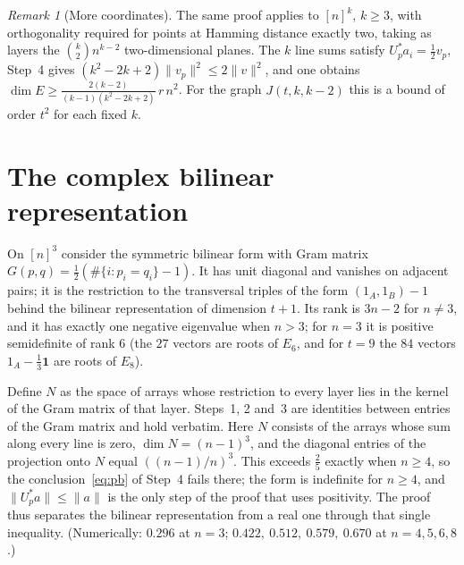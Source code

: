 \documentclass[11pt]{article}
\theoremstyle{remark}
\newtheorem{remark}[theorem]{Remark}
\newcommand{\norm}[1]{\lVert #1\rVert}
\begin{document}
\begin{remark}[More coordinates]\label{rem:k}
The same proof applies to $[n]^k$, $k\ge3$, with orthogonality required for points at Hamming distance exactly
two, taking as layers the $\binom k2n^{k-2}$ two-dimensional planes. The $k$ line sums satisfy
$U_p^*a_i=\tfrac12v_p$, Step~4 gives $(k^2-2k+2)\norm{v_p}^2\le2\norm v^2$, and one obtains
$\dim E\ge\frac{2(k-2)}{(k-1)(k^2-2k+2)}\,r\,n^2$. For the graph $J(t,k,k-2)$ this is a bound of order $t^2$
for each fixed $k$.
\end{remark}

\section{The complex bilinear representation}\label{sec:mink}
On $[n]^3$ consider the symmetric bilinear form with Gram matrix
$G(p,q)=\tfrac12(\#\{i:p_i=q_i\}-1)$. It has unit diagonal and vanishes on adjacent pairs; it is the
restriction to the transversal triples of the form $(1_A,1_B)-1$ behind the bilinear representation of
dimension $t+1$. Its rank is $3n-2$ for $n\ne3$, and it has exactly one negative eigenvalue when $n>3$; for
$n=3$ it is positive semidefinite of rank $6$ (the $27$ vectors are roots of $E_6$, and for $t=9$ the $84$ vectors $1_A-\tfrac13\mathbf 1$ are roots of
$E_8$).

Define $N$ as the space of arrays whose restriction to every layer lies in the kernel of the Gram matrix of
that layer. Steps~1, 2 and~3 are identities between entries of the Gram matrix and hold verbatim. Here
$N$ consists of the arrays whose sum along every line is zero, $\dim N=(n-1)^3$, and the diagonal entries of
the projection onto $N$ equal $((n-1)/n)^3$. This exceeds $\tfrac25$ exactly when $n\ge4$, so the conclusion~\eqref{eq:pb} of
Step~4 fails there; the form is indefinite for $n\ge4$, and $\norm{U_p^*a}\le\norm a$ is the only step of the
proof that uses positivity. The proof thus separates the bilinear representation from a real one through
that single inequality.
(Numerically: $0.296$ at $n=3$; $0.422,\ 0.512,\ 0.579,\ 0.670$ at $n=4,5,6,8$.)
\end{document}
